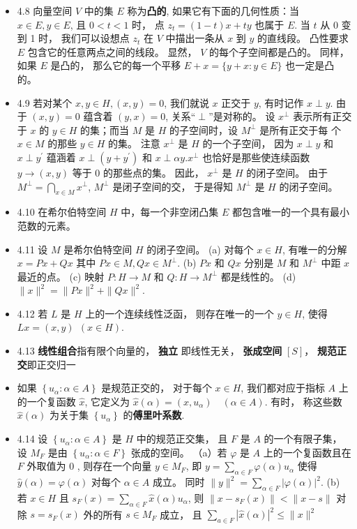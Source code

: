 \begin{itemize}
\item 4.8 向量空间 $V$ 中的集 $E$ 称为\textbf{凸的}, 如果它有下面的几何性质：当 $x \in E, y \in E$, 且 $0<t<1$ 时， 点 $z_{t}=(1-t) x+t y$ 也属于 $E$. 当 $t$ 从 0 变到 1 时， 我们可以设想点 $z_{t}$ 在 $V$ 中描出一条从 $x$ 到 $y$ 的直线段。 凸性要求 $E$ 包含它的任意两点之间的线段。 显然， $V$ 的每个子空间都是凸的。 同样， 如果 $E$ 是凸的， 那么它的每一个平移 $E+x=\{y+x: y \in E\}$ 也一定是凸的。

\item 4.9 若对某个 $x,y \in H,(x, y)=0$, 我们就说 $x$ 正交于 $y$, 有时记作 $x \perp y$. 由于 $(x, y)=0$ 蕴含着 $(y, x)=0$, 关系“$\perp$”是对称的。 设 $x^{\perp}$ 表示所有正交于 $x$ 的 $y \in H$ 的集；而当 $M$ 是 $H$ 的子空间时，设 $M^{\perp}$ 是所有正交于每 个 $x \in M$ 的那些 $y \in H$ 的集。 注意 $x^{\perp}$ 是 $H$ 的一个子空间， 因为 $x \perp y$ 和 $x \perp y^{\prime}$ 蕴涵着 $x \perp\left(y+y^{\prime}\right)$ 和 $x \perp \alpha y . x^{\perp}$ 也恰好是那些使连续函数 $y \rightarrow(x, y)$ 等于 0 的那些点的集。 因此， $x^{\perp}$ 是 $H$ 的闭子空间。 由于 $M^{\perp}=\bigcap_{x \in M} x^{\perp}$, $M^{\perp}$ 是闭子空间的交， 于是得知 $M^{\perp}$ 是 $H$ 的闭子空间。

\item 4.10 在希尔伯特空间 $H$ 中，每一个非空闭凸集 $E$ 都包含唯一的一个具有最小范数的元素。

\item 4.11 设 $M$ 是希尔伯特空间 $H$ 的闭子空间。 (a) 对每个 $x \in H$, 有唯一的分解 $x=P x+Q x$ 其中 $P x \in M, Q x \in M^{\perp}$. (b) $P x$ 和 $Q x$ 分别是 $M$ 和 $M^{\perp}$ 中距 $x$ 最近的点。 (c) 映射 $P: H \rightarrow M$ 和 $Q: H \rightarrow M^{\perp}$ 都是线性的。 (d) $\|x\|^{2}=\|P x\|^{2}+\|Q x\|^{2}$.

\item 4.12 若 $L$ 是 $H$ 上的一个连续线性泛函， 则存在唯一的一个 $y \in H$, 使得 $L x=(x, y)\ \ (x \in H)$.

\item 4.13 \textbf{线性组合}指有限个向量的， \textbf{独立} 即线性无关， \textbf{张成空间} $[S]$， \textbf{规范正交}即正交归一

\item 如果 $\left\{u_{\alpha}: \alpha \in A\right\}$ 是规范正交的， 对于每个 $x \in H$, 我们都对应于指标 $A$ 上的一个复函数 $\hat{x}$, 它定义为 $\hat{x}(\alpha)=\left(x, u_{\alpha}\right) \quad(\alpha \in A)$. 有时， 称这些数 $\hat{x}(\alpha)$ 为关于集 $\left\{u_{\alpha}\right\}$ 的\textbf{傅里叶系数}.

\item 4.14 设 $\left\{u_{\alpha}: \alpha \in A\right\}$ 是 $H$ 中的规范正交集， 且 $F$ 是 $A$ 的一个有限子集， 设 $M_{F}$ 是由 $\left\{u_{\alpha}: \alpha \in F\right\}$ 张成的空间。
（a）若 $\varphi$ 是 $A$ 上的一个复函数且在 $F$ 外取值为 0 , 则存在一个向量 $y \in M_{F}$, 即 $y =\sum_{\alpha \in F} \varphi(\alpha) u_{\alpha}$ 使得 $\hat y(\alpha)=\varphi(\alpha)$ 对每个 $\alpha \in A$ 成立。 同时 $\|y\|^{2} =\sum_{\alpha \in F}|\varphi(\alpha)|^{2}$.
(b) 若 $x \in H$ 且 $s_{F}(x)=\sum_{\alpha \in F} \hat{x}(\alpha) u_{\alpha}$, 则 $\left\|x-s_{F}(x)\right\|<\|x-s\|$ 对除 $s=s_{F}(x)$ 外的所有 $s \in M_{F}$ 成立， 且 $\sum_{a \in F}|\hat{x}(\alpha)|^{2} \leqslant\|x\|^{2}$


\end{itemize}
